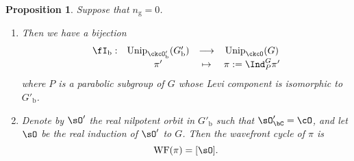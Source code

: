\documentclass[12pt,a4paper]{amsart}
\newcommand{\WF}{\mathrm{WF}}
\numberwithin{equation}{section}
\newtheorem{prop}[thm]{Proposition}
\theoremstyle{remark}
\def\Unip{\mathrm{Unip}}
\begin{document}
\begin{prop}\label{lem:Unip.BP} 
Suppose that $n_{\mathrm g}=0$.
\begin{enumerate}
\item Then we have a bijection
  \[
    \begin{array}{rccc}
      \fI_{\mathrm b}: &\Unip_{\ckcO'_{\mathrm b}}(G'_{\mathrm b}) & \longrightarrow & \Unip_{\ckcO}(G) \\
      &\pi' & \mapsto & \pi:=\Ind_{P}^{G}\pi'
    \end{array}
  \]
  where $P$ is a parabolic subgroup of $G$ whose Levi component is
  isomorphic to $G'_{\mathrm b}$.
 \item Denote by $\sO'$ the real nilpotent orbit in $G'_{\mathrm b}$ such that $\sO'_{\bC}=\cO$, and let $\sO$ be the real induction of $\sO'$ to $G$.
  Then the wavefront cycle of $\pi $ is
  \[
    \WF(\pi) = [\sO].
  \]
 \end{enumerate}
\end{prop}
\end{document}
